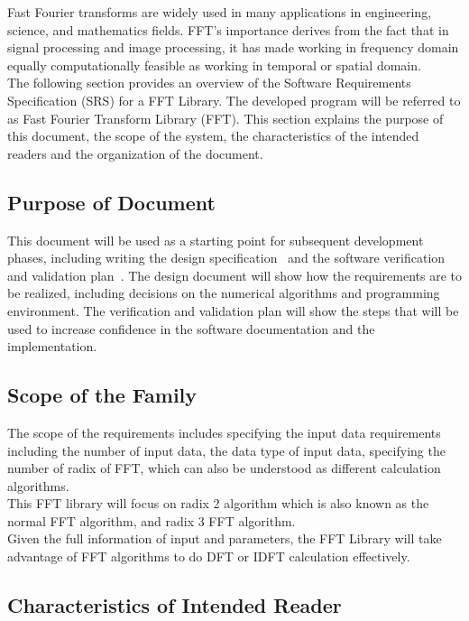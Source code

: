 \documentclass[12pt]{article}
\newcommand{\famname}{FFT}
\begin{document}
Fast Fourier transforms are widely used in many applications in engineering,
science, and mathematics fields. FFT's importance derives from the fact that in signal
processing and image processing, it has made working in frequency domain equally
computationally feasible as working in temporal or spatial domain. \\

The following section provides an overview of the Software Requirements
Specification (SRS) for a FFT Library. The developed program will be referred to
as Fast Fourier Transform Library (\famname{}). This section explains the
purpose of this document, the scope of the system, the characteristics of the
intended readers and the organization of the document.

\subsection{Purpose of Document}

This document will be used as a starting point for subsequent development
phases, including writing the design specification~\cite{FFT_Design} and the software verification
and validation plan~\cite{FFT_VVplan}. The design document will show how the requirements are to
be realized, including decisions on the numerical algorithms and programming
environment. The verification and validation plan will show the steps that will
be used to increase confidence in the software documentation and the
implementation.

\subsection{Scope of the Family} 

The scope of the requirements includes specifying the input
data requirements  including the number of input data, the data type of input data, specifying the number of radix of FFT, which can also be understood as 
different calculation algorithms. \\
This FFT library will focus on radix 2 algorithm which is also known as the normal FFT algorithm, and radix 3 FFT algorithm. \\
Given the full information of input and parameters, the FFT Library will take advantage of FFT algorithms to do DFT
or IDFT calculation effectively.

\subsection{Characteristics of Intended Reader} 
\end{document}
